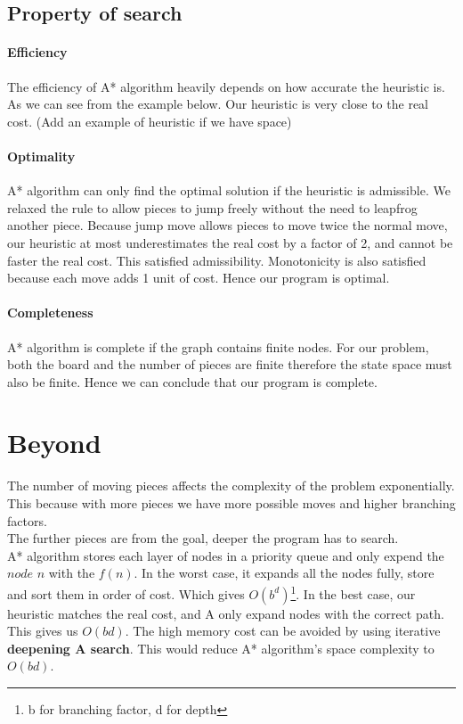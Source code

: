 \documentclass[11pt,a4paper]{article}
\begin{document}
    \subsection{Property of search}
        \paragraph{Efficiency} The efficiency of A* algorithm heavily depends on how accurate the heuristic is. As we can see from the example below. Our heuristic is very close to the real cost. (Add an example of heuristic if we have space) 
        \paragraph{Optimality} A* algorithm can only find the optimal solution if the heuristic is admissible. We relaxed the rule to allow pieces to jump freely without the need to leapfrog another piece. Because jump move allows pieces to move twice the normal move, our heuristic at most underestimates the real cost by a factor of 2, and cannot be faster the real cost. This satisfied admissibility. Monotonicity is also satisfied because each move adds 1 unit of cost. Hence our program is optimal.
        \vspace{-10pt}
        \paragraph{Completeness} A* algorithm is complete if the graph contains finite nodes. For our problem, both the board and the number of pieces are finite therefore the state space must also be finite. Hence we can conclude that our program is complete.
    \section{Beyond}
        The number of moving pieces affects the complexity of the problem exponentially. This because with more pieces we have more possible moves and higher branching factors.\\
        The further pieces are from the goal, deeper the program has to search.\\
        A* algorithm stores each layer of nodes in a priority queue and only expend the $node$ $n$ with the $f(n)$. In the worst case, it expands all the nodes fully, store and sort them in order of cost. Which gives $O(b^d)$\footnote{b for branching factor, d for depth}. In the best case, our heuristic matches the real cost, and A only expand nodes with the correct path. This gives us $O(bd)$. The high memory cost can be avoided by using iterative \textbf{deepening A search}. This would reduce A* algorithm's space complexity to $O(bd)$.
        
\end{document}
